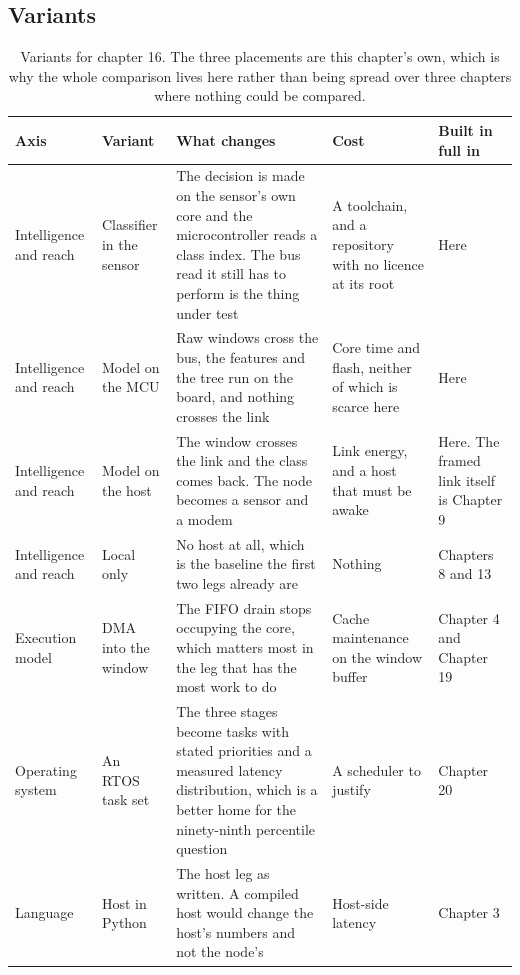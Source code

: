 \subsection*{Variants}

\begin{table}[H]\centering\small
\begin{tabular}{p{24mm}p{26mm}p{44mm}p{22mm}p{20mm}}
\toprule
Axis & Variant & What changes & Cost & Built in full in \\
\midrule
Intelligence and reach & Classifier in the sensor & The decision is made on the sensor's own core and the microcontroller reads a class index. The bus read it still has to perform is the thing under test & A toolchain, and a repository with no licence at its root & Here \\
Intelligence and reach & Model on the MCU & Raw windows cross the bus, the features and the tree run on the board, and nothing crosses the link & Core time and flash, neither of which is scarce here & Here \\
Intelligence and reach & Model on the host & The window crosses the link and the class comes back. The node becomes a sensor and a modem & Link energy, and a host that must be awake & Here. The framed link itself is Chapter 9 \\
Intelligence and reach & Local only & No host at all, which is the baseline the first two legs already are & Nothing & Chapters 8 and 13 \\
Execution model & DMA into the window & The FIFO drain stops occupying the core, which matters most in the leg that has the most work to do & Cache maintenance on the window buffer & Chapter 4 and Chapter 19 \\
Operating system & An RTOS task set & The three stages become tasks with stated priorities and a measured latency distribution, which is a better home for the ninety-ninth percentile question & A scheduler to justify & Chapter 20 \\
Language & Host in Python & The host leg as written. A compiled host would change the host's numbers and not the node's & Host-side latency & Chapter 3 \\
\bottomrule
\end{tabular}
\caption{Variants for chapter 16. The three placements are this chapter's own, which is why the whole comparison lives here rather than being spread over three chapters where nothing could be compared.}
\end{table}

